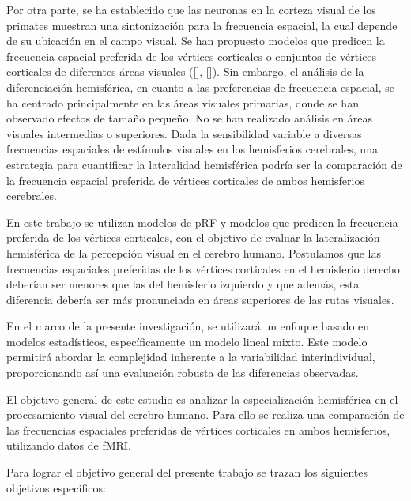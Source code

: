 Por otra parte, se ha establecido que las neuronas en la corteza visual de los primates muestran una sintonización para la frecuencia espacial, la cual depende de su ubicación en el campo visual. Se han propuesto modelos que predicen la frecuencia espacial preferida de los v\'ertices corticales o conjuntos de v\'ertices corticales de diferentes áreas visuales ([\cite{aghajari_population_2020}], [\cite{broderick_mapping_2022}]). Sin embargo, el an\'alisis de la diferenciación hemisférica, en cuanto a las preferencias de frecuencia espacial, se ha centrado principalmente en las áreas visuales primarias, donde se han observado efectos de tamaño pequeño. No se han realizado análisis en áreas visuales intermedias o superiores. Dada la sensibilidad variable a diversas frecuencias espaciales de estímulos visuales en los hemisferios cerebrales, una estrategia para cuantificar la lateralidad hemisférica podría ser la comparación de la frecuencia espacial preferida de v\'ertices corticales de ambos hemisferios cerebrales. 

En este trabajo se utilizan modelos de pRF y modelos que predicen la frecuencia preferida de los v\'ertices corticales, con el objetivo de evaluar la lateralización hemisférica de la percepci\'on visual en el cerebro humano. Postulamos que las frecuencias espaciales preferidas de los v\'ertices corticales en el hemisferio derecho deberían ser menores que las del hemisferio izquierdo y que además, esta diferencia debería ser más pronunciada en áreas superiores de las rutas  visuales.


En el marco de la presente investigación, se utilizará un enfoque basado en modelos estadísticos, específicamente un modelo lineal mixto. Este modelo permitirá abordar la complejidad inherente a la variabilidad interindividual, proporcionando así una evaluación robusta de las diferencias observadas.

El objetivo general de este estudio es analizar la especializaci\'on hemisférica en el procesamiento visual del cerebro humano. Para ello se realiza una comparación de las frecuencias espaciales preferidas de v\'ertices corticales en ambos hemisferios, utilizando datos de fMRI.

Para lograr el objetivo general del presente trabajo se
trazan los siguientes objetivos específicos:

